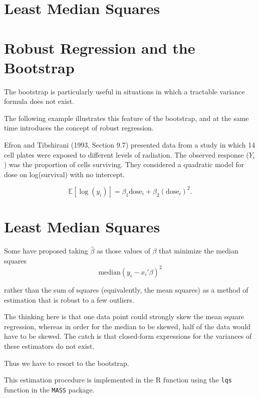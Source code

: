 \documentclass[
  letterpaper,
  DIV=11,
  numbers=noendperiod]{scrreport}
\begin{document}
\hypertarget{least-median-squares}{%
\section{Least Median Squares}\label{least-median-squares}}

\hypertarget{robust-regression-and-the-bootstrap}{%
\section{Robust Regression and the
Bootstrap}\label{robust-regression-and-the-bootstrap}}

The bootstrap is particularly useful in situations in which a tractable
variance formula does not exist.

The following example illustrates this feature of the bootstrap, and at
the same time introduces the concept of robust regression.

Efron and Tibshirani (1993, Section 9.7) presented data from a study in
which 14 cell plates were exposed to different levels of radiation. The
observed response (\(Y_i\)) was the proportion of cells surviving. They
considered a quadratic model for dose on log(survival) with no
intercept.

\[
\mathbb E[\log(y_i)] = \beta_1 \text{dose}_i + \beta_2 (\text{dose}_i)^2.
\]

\hypertarget{least-median-squares-1}{%
\section{Least Median Squares}\label{least-median-squares-1}}

Some have proposed taking \(\hat \beta\) as those values of \(\beta\)
that minimize the median squares \[
\text{median}(y_i - x_i' \beta)^2
\]

rather than the sum of squares (equivalently, the mean squares) as a
method of estimation that is robust to a few outliers.

The thinking here is that one data point could strongly skew the mean
square regression, whereas in order for the median to be skewed, half of
the data would have to be skewed. The catch is that closed-form
expressions for the variances of these estimators do not exist.

Thus we have to resort to the bootstrap.

This estimation procedure is implemented in the R function using the
\texttt{lqs} function in the \texttt{MASS} package.
\end{document}
